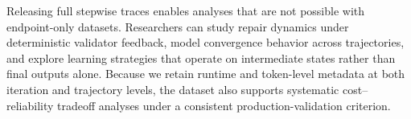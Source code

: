 
Releasing full stepwise traces enables analyses that are not possible with endpoint-only datasets. Researchers can study repair dynamics under deterministic validator feedback, model convergence behavior across trajectories, and explore learning strategies that operate on intermediate states rather than final outputs alone. Because we retain runtime and token-level metadata at both iteration and trajectory levels, the dataset also supports systematic cost--reliability tradeoff analyses under a consistent production-validation criterion.
